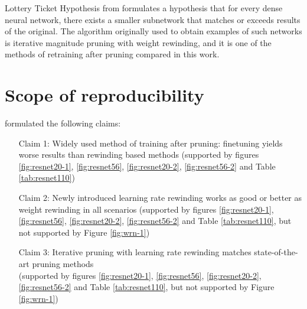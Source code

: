 Lottery Ticket Hypothesis from \cite{Frankle} formulates a hypothesis that for every dense neural network, there exists a smaller subnetwork that matches or exceeds results of the original. The algorithm originally used to obtain examples of such networks is iterative magnitude pruning with weight rewinding, and it is one of the methods of retraining after pruning compared in this work.


\section{Scope of reproducibility}
\label{sec:claims}



\cite{Renda} formulated the following claims:
\begin{itemize}
    \item [Claim 1:] Widely used method of training after pruning: finetuning yields worse results than rewinding based methods (supported by figures \ref{fig:resnet20-1}, \ref{fig:resnet56}, \ref{fig:resnet20-2}, \ref{fig:resnet56-2} and Table \ref{tab:resnet110})
    \item [Claim 2:] Newly introduced learning rate rewinding works as good or better as weight rewinding in all scenarios (supported by figures \ref{fig:resnet20-1}, \ref{fig:resnet56}, \ref{fig:resnet20-2}, \ref{fig:resnet56-2} and Table \ref{tab:resnet110}, but not supported by Figure \ref{fig:wrn-1})
    \item [Claim 3:] Iterative pruning with learning rate rewinding matches state-of-the-art pruning methods \\(supported by figures \ref{fig:resnet20-1}, \ref{fig:resnet56}, \ref{fig:resnet20-2}, \ref{fig:resnet56-2} and Table \ref{tab:resnet110}, but not supported by Figure \ref{fig:wrn-1})
\end{itemize}

